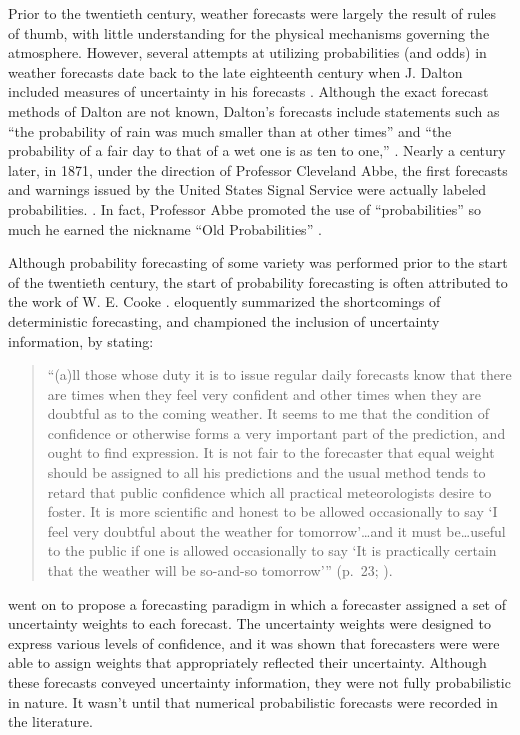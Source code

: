 Prior to the twentieth century, weather forecasts were largely the result of rules of thumb, with little understanding for the physical mechanisms governing the atmosphere.
However, several attempts at utilizing probabilities (and odds) in weather forecasts date back to the late eighteenth century when J. Dalton included measures of uncertainty in his forecasts \citep{Dalton1793, Murphy1998}.
Although the exact forecast methods of Dalton are not known, Dalton's forecasts include statements such as ``the probability of rain was much smaller than at other times'' and ``the probability of a fair day to that of a wet one is as ten to one,'' \citep{Murphy1998}.
Nearly a century later, in 1871, under the direction of Professor Cleveland Abbe, the first forecasts and warnings issued by the United States Signal Service were actually labeled probabilities. \citep{Whitnah1961, Murphy1998}.
In fact, Professor Abbe promoted the use of ``probabilities'' so much he earned the nickname ``Old Probabilities'' \citep{Scott1873, Murphy1998}.


Although probability forecasting of some variety was performed prior to the start of the twentieth century, the start of probability forecasting is often attributed to the work of W. E. Cooke \citep{Murphy1998}.
\cite{Cooke1906a} eloquently summarized the shortcomings of deterministic forecasting, and championed the inclusion of uncertainty information, by stating:
\begin{quote}
    ``(a)ll those whose duty it is to issue regular daily forecasts know that there are times when they feel very confident and other times when they are doubtful as to the coming weather. It seems to me that the condition of confidence or otherwise forms a very important part of the prediction, and ought to find expression. It is not fair to the forecaster that equal weight should be assigned to all his predictions and the usual method tends to retard that public confidence which all practical meteorologists desire to foster. It is more scientific and honest to be allowed occasionally to say `I feel very doubtful about the weather for tomorrow'\dots and it must be\dots useful to the public if one is allowed occasionally to say `It is practically certain that the weather will be so-and-so tomorrow''' (\mbox{p. 23}; \citealp{Murphy1998}).
\end{quote}


\noindent\cite{Cooke1906a} went on to propose a forecasting paradigm in which a forecaster assigned a set of uncertainty weights to each forecast.
The uncertainty weights were designed to express various levels of confidence, and it was shown that forecasters were were able to assign weights that appropriately reflected their uncertainty.
Although these forecasts conveyed uncertainty information, they were not fully probabilistic in nature.
It wasn't until \cite{Hallenbeck1920} that numerical probabilistic forecasts were recorded in the literature.


